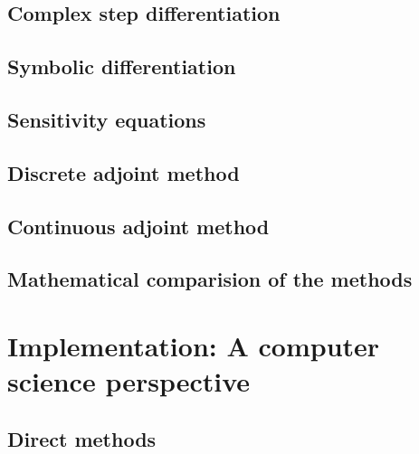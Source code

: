 \documentclass[12pt]{article}
\begin{document}
\subsection{Complex step differentiation}
\label{section:comple-step-differentiation}


\subsection{Symbolic differentiation}
\label{section:symbolic}


\subsection{Sensitivity equations}
\label{section:sensitivity-equation}


% 

\subsection{Discrete adjoint method}
\label{section:discrete-adjoint}


\subsection{Continuous adjoint method}
\label{section:continuous-adjoint}


\subsection{Mathematical comparision of the methods}
\label{section:compatison-math}


\section{Implementation: A computer science perspective}
\label{sec:computational-implementation}

\subsection{Direct methods}
\label{section:direct-methods}

\end{document}
